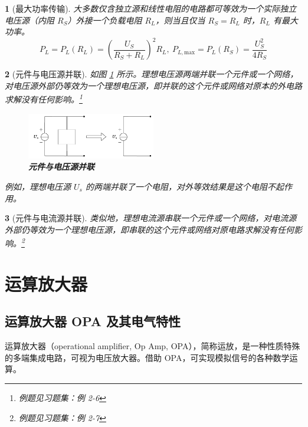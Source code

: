 \documentclass[UTF8]{report}
\theoremstyle{MyLineTheoremStyle} %
\theoremstyle{MyBlockTheoremStyle} %
\theoremstyle{MySubsubsectionStyle} %
\newtheorem{definition}{}
\begin{document}
\begin{definition}[最大功率传输]
大多数仅含独立源和线性电阻的电路都可等效为一个实际独立电压源（内阻 $R_S$）外接一个负载电阻 $R_L$，则当且仅当 $R_S = R_L$ 时，$R_L$ 有最大功率。
\begin{equation}
P_L = P_L(R_L) =  \left(\frac{U_S}{R_S + R_L}\right)^2R_L, \ P_{L,\mathrm{max}} = P_L(R_S) = \frac{U_S^2}{4R_S}
\end{equation}
\end{definition}



\begin{definition}[元件与电压源并联]
如图 \ref{元件与电压源并联}  所示。理想电压源两端并联一个元件或一个网络，对电压源外部仍等效为一个理想电压源，即并联的这个元件或网络对原本的外电路求解没有任何影响。\footnote{例题见习题集：例 2-6}

\begin{figure}[H]\centering
\includegraphics[width=0.5\textwidth]{assets/1,2/电阻与电源并联.drawio.pdf}
\caption{\textbf{元件与电压源并联}}\label{元件与电压源并联}
\end{figure}

例如，理想电压源 $U_s$ 的两端并联了一个电阻，对外等效结果是这个电阻不起作用。
\end{definition}

\begin{definition}[元件与电流源并联]
    类似地，理想电流源串联一个元件或一个网络，对电流源外部仍等效为一个理想电压源，即串联的这个元件或网络对原电路求解没有任何影响。\footnote{例题见习题集：例 2-7}
\end{definition}

\section{运算放大器}

\subsection{运算放大器 OPA 及其电气特性}


运算放大器（operational amplifier, Op Amp, OPA），简称运放，是一种性质特殊的多端集成电路，可视为电压放大器。借助 OPA，可实现模拟信号的各种数学运算。
\end{document}
